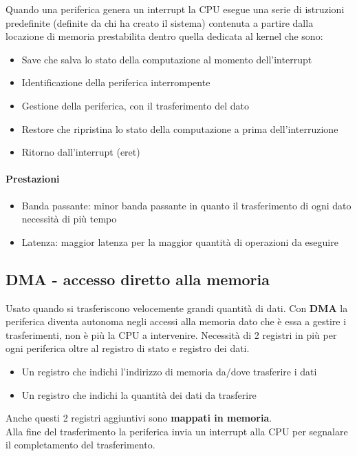 \documentclass[12pt, a4paper, openany]{book}
\begin{document}
Quando una periferica genera un interrupt la CPU
esegue una serie di istruzioni predefinite (definite da chi ha creato il sistema)
contenuta a partire dalla locazione di memoria prestabilita dentro quella
dedicata al kernel che sono:
\begin{itemize}
    \item Save che salva lo stato della computazione al momento dell’interrupt
    \item Identificazione della periferica interrompente
    \item Gestione della periferica, con il trasferimento del dato
    \item Restore che ripristina lo stato della computazione a prima dell’interruzione
    \item Ritorno dall’interrupt (eret)
\end{itemize}

\paragraph*{Prestazioni}
\begin{itemize}
    \item Banda passante: minor banda passante in quanto il trasferimento di ogni dato necessità di più tempo
    \item Latenza: maggior latenza per la maggior quantità di operazioni da eseguire 
\end{itemize}

\subsection*{DMA - accesso diretto alla memoria}
Usato quando si trasferiscono velocemente grandi quantità di dati.
Con \textbf{DMA} la periferica diventa autonoma negli accessi alla memoria dato che è essa a
gestire i trasferimenti, non è più la CPU a intervenire. Necessità di 2 registri in più
per ogni periferica oltre al registro di stato e registro dei dati.
\begin{itemize}
    \item Un registro che indichi l'indirizzo di memoria da/dove trasferire i dati
    \item Un registro che indichi la quantità dei dati da trasferire
\end{itemize}
Anche questi 2 registri aggiuntivi sono \textbf{mappati in memoria}.
\\ Alla fine del trasferimento la periferica invia un interrupt alla CPU per segnalare il completamento 
del trasferimento.
\end{document}
